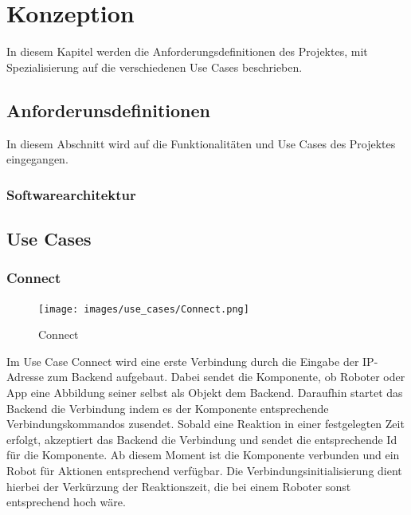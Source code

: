 \section{Konzeption}

In diesem Kapitel werden die Anforderungsdefinitionen des Projektes, mit Spezialisierung auf die verschiedenen Use Cases beschrieben.

\subsection{Anforderunsdefinitionen}
In diesem Abschnitt wird auf die Funktionalitäten und Use Cases des Projektes eingegangen.

\subsubsection{Softwarearchitektur}

\subsection{Use Cases}
\subsubsection{Connect}

\begin{figure}[h]
	\begin{center}
		\texttt{[image: images/use\_cases/Connect.png]}
	\end{center}
	\caption{Connect}
	\label{fig:UC_Connect}
\end{figure}

\noindent
Im Use Case Connect wird eine erste Verbindung durch die Eingabe der IP-Adresse zum Backend aufgebaut. Dabei sendet die Komponente, ob Roboter oder App eine Abbildung seiner selbst als Objekt dem Backend. Daraufhin startet das Backend die Verbindung indem es der Komponente entsprechende Verbindungskommandos zusendet. Sobald eine Reaktion in einer festgelegten Zeit erfolgt, akzeptiert das Backend die Verbindung und sendet die entsprechende Id für die Komponente. Ab diesem Moment ist die Komponente verbunden und ein Robot für Aktionen entsprechend verfügbar. Die Verbindungsinitialisierung dient hierbei der Verkürzung der Reaktionszeit, die bei einem Roboter sonst entsprechend hoch wäre.

